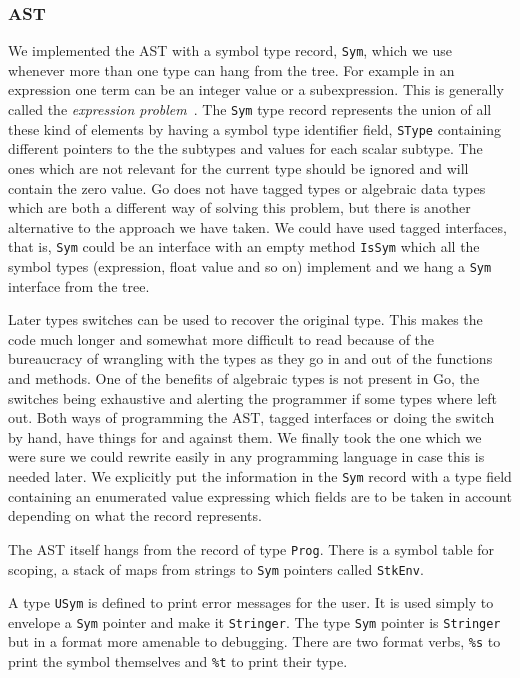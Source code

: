 \documentclass[a4paper]{article}
\begin{document}
\subsubsection{AST}
We implemented the AST with a symbol type record, \verb+Sym+, which we use
whenever more than one type can hang from the tree. For example
in an expression one term can be an integer value or a subexpression.
This is generally called the \emph{expression problem}~\cite{exprprob}.
The \verb+Sym+ type record represents the union of all these kind of elements by
having a symbol type identifier field, \verb+SType+ containing different pointers to the
the subtypes and values for each scalar subtype. The ones which are not
relevant for the current type should be ignored and will contain the zero value.
Go does not have tagged types
or algebraic data types which are both a different way of solving this problem,
but there is another alternative to the approach we have taken.
We could have used tagged interfaces, that is, \verb+Sym+ could be an interface
with an empty method \verb+IsSym+ which all the symbol types
(expression, float value and so on) implement and we hang a \verb+Sym+ interface
from the tree.

Later types switches can be used to recover the original type.
This makes the code much longer and somewhat more difficult to
read because of the bureaucracy of wrangling with the types
as they go in and out of the functions and methods.
One of the benefits of algebraic types is not present in Go, the switches being
exhaustive and alerting the programmer if some
types where left out.
Both ways of programming the AST, tagged interfaces or doing the switch by hand,
have things for and against them.
We finally took the one which we were sure we could rewrite easily in any
programming language in case this is needed later. We explicitly put the
information in the \verb+Sym+ record with a type field containing an enumerated
value expressing which fields
are to be taken in account depending on what the record represents.

The AST itself hangs from the record of type \verb+Prog+.
There is a symbol table for scoping, a stack of maps from strings to \verb+Sym+ pointers
called \verb+StkEnv+.

A type \verb+USym+ is defined to print error messages for the
user. It is used simply to envelope a \verb+Sym+ pointer and make it
\verb+Stringer+. The type \verb+Sym+ pointer is \verb+Stringer+ but in a format more
amenable to debugging. There are two format verbs, \verb+%s+ to print
the symbol themselves and \verb+%t+ to print their type.
\end{document}
